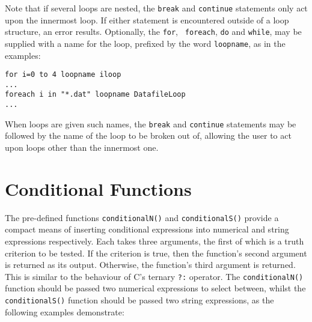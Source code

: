 Note that if several loops are nested, the {\tt break} and {\tt continue}
statements only act upon the innermost loop. If either statement is encountered
outside of a loop structure, an error results. Optionally, the {\tt for}, {\tt
foreach}, {\tt do} and {\tt while}, may be supplied with a name for the loop,
prefixed by the word {\tt loopname}, as in the examples:

\begin{verbatim}
for i=0 to 4 loopname iloop
...
foreach i in "*.dat" loopname DatafileLoop
...
\end{verbatim}

\noindent When loops are given such names, the {\tt break} and {\tt continue}
statements may be followed by the name of the loop to be broken out of,
allowing the user to act upon loops other than the innermost one.

\section{Conditional Functions}

The pre-defined functions {\tt conditionalN()} and {\tt conditionalS()} provide
a compact means of inserting conditional expressions into numerical and string
expressions respectively.  Each takes three arguments, the first of which is a
truth criterion to be tested. If the criterion is true, then the function's
second argument is returned as its output. Otherwise, the function's third
argument is returned. This is similar to the behaviour of C's ternary {\tt ?:}
operator.  The {\tt conditionalN()} function should be passed two numerical
expressions to select between, whilst the {\tt conditionalS()} function should
be passed two string expressions, as the following examples demonstrate:

\vspace{2mm}
{\footnotesize
{}\newline
{}\newline
{}\newline
{}\newline
{}\newline
{}\newline
}

